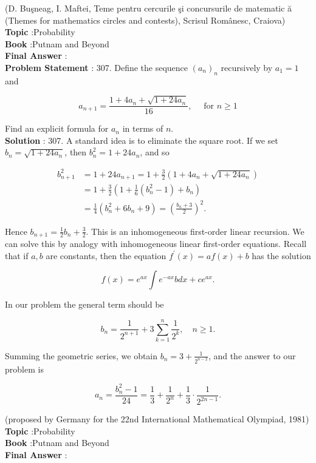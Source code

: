 \documentclass[10pt]{article}
\begin{document}
(D. Buşneag, I. Maftei, Teme pentru cercurile şi concursurile de matematic ă (Themes for mathematics circles and contests), Scrisul Românesc, Craiova)
\\
\textbf{Topic} :Probability\\
\textbf{Book} :Putnam and Beyond\\
\textbf{Final Answer} :\\


\textbf{Problem Statement} :
307. Define the sequence $\left(a_{n}\right)_{n}$ recursively by $a_{1}=1$ and

$$
a_{n+1}=\frac{1+4 a_{n}+\sqrt{1+24 a_{n}}}{16}, \quad \text { for } n \geq 1
$$

Find an explicit formula for $a_{n}$ in terms of $n$. 
\\
\textbf{Solution} :
307. A standard idea is to eliminate the square root. If we set $b_{n}=\sqrt{1+24 a_{n}}$, then $b_{n}^{2}=1+24 a_{n}$, and so

$$
\begin{aligned}
b_{n+1}^{2} &=1+24 a_{n+1}=1+\frac{3}{2}\left(1+4 a_{n}+\sqrt{1+24 a_{n}}\right) \\
&=1+\frac{3}{2}\left(1+\frac{1}{6}\left(b_{n}^{2}-1\right)+b_{n}\right) \\
&=\frac{1}{4}\left(b_{n}^{2}+6 b_{n}+9\right)=\left(\frac{b_{n}+3}{2}\right)^{2} .
\end{aligned}
$$

Hence $b_{n+1}=\frac{1}{2} b_{n}+\frac{3}{2}$. This is an inhomogeneous first-order linear recursion. We can solve this by analogy with inhomogeneous linear first-order equations. Recall that if $a, b$ are constants, then the equation $f^{\prime}(x)=a f(x)+b$ has the solution

$$
f(x)=e^{a x} \int e^{-a x} b d x+c e^{a x} .
$$

In our problem the general term should be

$$
b_{n}=\frac{1}{2^{n+1}}+3 \sum_{k=1}^{n} \frac{1}{2^{k}}, \quad n \geq 1 .
$$

Summing the geometric series, we obtain $b_{n}=3+\frac{1}{2^{n-2}}$, and the answer to our problem is

$$
a_{n}=\frac{b_{n}^{2}-1}{24}=\frac{1}{3}+\frac{1}{2^{n}}+\frac{1}{3} \cdot \frac{1}{2^{2 n-1}} .
$$

(proposed by Germany for the 22nd International Mathematical Olympiad, 1981)
\\
\textbf{Topic} :Probability\\
\textbf{Book} :Putnam and Beyond\\
\textbf{Final Answer} :\\
\end{document}
